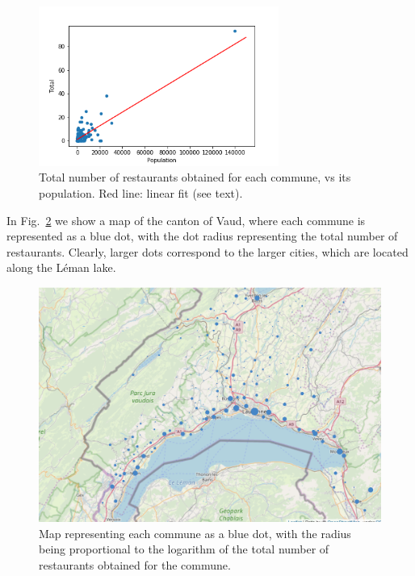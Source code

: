 \documentclass[12pt]{article}
\begin{document}
\begin{figure}
\begin{center}
\includegraphics[width=0.7\textwidth]{Figures/Fig2}
\caption{\label{fig2} Total number of restaurants obtained for each commune, vs its population.  Red line: linear fit (see text).}
\end{center}
\end{figure}

In Fig.~\ref{fig3} we show a map of the canton of Vaud, where each commune is represented as a blue dot, with the dot radius representing the total number of restaurants. Clearly, larger dots correspond to the larger cities, which are located along the L\'eman lake. 

\begin{figure}
\begin{center}
\includegraphics[width=\textwidth]{Figures/Fig3}
\caption{\label{fig3} Map representing each commune as a blue dot, with the radius being proportional to the logarithm of the total number of restaurants obtained for the commune.}
\end{center}
\end{figure}
\end{document}
